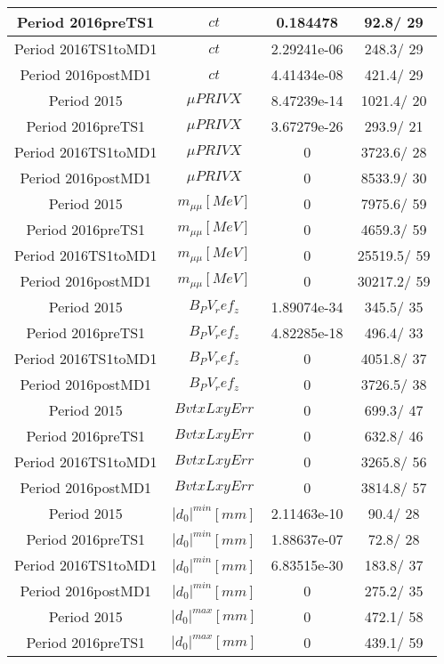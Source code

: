 \documentclass{article}
\begin{document}
\begin{longtable}{c|c|c|c}
\hline
 Period 2016preTS1 & $ct$ & 0.184478 &  92.8/ 29\\
\hline
 Period 2016TS1toMD1 & $ct$ & 2.29241e-06 & 248.3/ 29\\
\hline
 Period 2016postMD1 & $ct$ & 4.41434e-08 & 421.4/ 29\\
\hline
 Period 2015 & $\mu PRIVX$ & 8.47239e-14 & 1021.4/ 20\\
\hline
 Period 2016preTS1 & $\mu PRIVX$ & 3.67279e-26 & 293.9/ 21\\
\hline
 Period 2016TS1toMD1 & $\mu PRIVX$ & 0 & 3723.6/ 28\\
\hline
 Period 2016postMD1 & $\mu PRIVX$ & 0 & 8533.9/ 30\\
\hline
 Period 2015 & $m_{\mu\mu} [MeV]$ & 0 & 7975.6/ 59\\
\hline
 Period 2016preTS1 & $m_{\mu\mu} [MeV]$ & 0 & 4659.3/ 59\\
\hline
 Period 2016TS1toMD1 & $m_{\mu\mu} [MeV]$ & 0 & 25519.5/ 59\\
\hline
 Period 2016postMD1 & $m_{\mu\mu} [MeV]$ & 0 & 30217.2/ 59\\
\hline
 Period 2015 & $B_PV_ref_z$ & 1.89074e-34 & 345.5/ 35\\
\hline
 Period 2016preTS1 & $B_PV_ref_z$ & 4.82285e-18 & 496.4/ 33\\
\hline
 Period 2016TS1toMD1 & $B_PV_ref_z$ & 0 & 4051.8/ 37\\
\hline
 Period 2016postMD1 & $B_PV_ref_z$ & 0 & 3726.5/ 38\\
\hline
 Period 2015 & $BvtxLxyErr$ & 0 & 699.3/ 47\\
\hline
 Period 2016preTS1 & $BvtxLxyErr$ & 0 & 632.8/ 46\\
\hline
 Period 2016TS1toMD1 & $BvtxLxyErr$ & 0 & 3265.8/ 56\\
\hline
 Period 2016postMD1 & $BvtxLxyErr$ & 0 & 3814.8/ 57\\
\hline
 Period 2015 & $|d_{0}|^{min} [mm]$ & 2.11463e-10 &  90.4/ 28\\
\hline
 Period 2016preTS1 & $|d_{0}|^{min} [mm]$ & 1.88637e-07 &  72.8/ 28\\
\hline
 Period 2016TS1toMD1 & $|d_{0}|^{min} [mm]$ & 6.83515e-30 & 183.8/ 37\\
\hline
 Period 2016postMD1 & $|d_{0}|^{min} [mm]$ & 0 & 275.2/ 35\\
\hline
 Period 2015 & $|d_{0}|^{max} [mm]$ & 0 & 472.1/ 58\\
\hline
 Period 2016preTS1 & $|d_{0}|^{max} [mm]$ & 0 & 439.1/ 59\\

\end{longtable}
\end{document}
